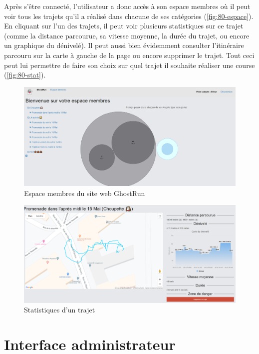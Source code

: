 Après s'être connecté, l'utilisateur a donc accès à son espace membres où il peut voir tous les trajets qu'il a réalisé dans chacune de ses catégories (\autoref{fig:80-espace}). En cliquant sur l'un des trajets, il peut voir plusieurs statistiques sur ce trajet (comme la distance parcourue, sa vitesse moyenne, la durée du trajet, ou encore un graphique du dénivelé). Il peut aussi bien évidemment consulter l'itinéraire parcouru sur la carte à gauche de la page ou encore supprimer le trajet. Tout ceci peut lui permettre de faire son choix sur quel trajet il souhaite réaliser une course (\autoref{fig:80-stat}).

\begin{figure}[H]
    \centering
    \includegraphics[keepaspectratio, width=2\textwidth/2, height=2\textheight/5]{ima/espace}
    \caption{Espace membres du site web GhostRun}
    \label{fig:80-espace}
\end{figure}

\begin{figure}[H]
    \centering
    \includegraphics[keepaspectratio, width=2\textwidth/2, height=2\textheight/5]{ima/stat}
    \caption{Statistiques d'un trajet}
    \label{fig:80-stat}
\end{figure}


\section{Interface administrateur}

